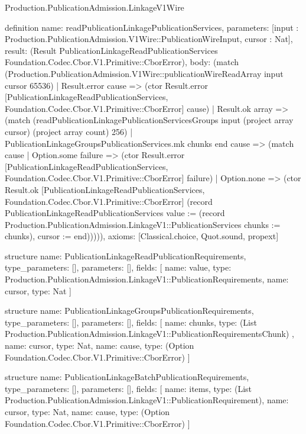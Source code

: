\begin{lexlean}{Production.PublicationAdmission.LinkageV1Wire}
\begin{semanticmodule}
definition{
  name: readPublicationLinkagePublicationServices,
  parameters: [input : Production.PublicationAdmission.V1Wire::PublicationWireInput, cursor : Nat],
  result: (Result PublicationLinkageReadPublicationServices Foundation.Codec.Cbor.V1.Primitive::CborError),
  body: (match (Production.PublicationAdmission.V1Wire::publicationWireReadArray input cursor 65536)
    | Result.error cause => (ctor Result.error [PublicationLinkageReadPublicationServices, Foundation.Codec.Cbor.V1.Primitive::CborError] cause)
    | Result.ok array => (match (readPublicationLinkagePublicationServicesGroups input (project array cursor) (project array count) 256)
      | PublicationLinkageGroupsPublicationServices.mk chunks end cause => (match cause
        | Option.some failure => (ctor Result.error [PublicationLinkageReadPublicationServices, Foundation.Codec.Cbor.V1.Primitive::CborError] failure)
        | Option.none => (ctor Result.ok [PublicationLinkageReadPublicationServices, Foundation.Codec.Cbor.V1.Primitive::CborError] (record PublicationLinkageReadPublicationServices {value := (record Production.PublicationAdmission.LinkageV1::PublicationServices {chunks := chunks}), cursor := end}))))),
  axioms: [Classical.choice, Quot.sound, propext]
}

structure{
  name: PublicationLinkageReadPublicationRequirements,
  type_parameters: [],
  parameters: [],
  fields: [
    {name: value, type: Production.PublicationAdmission.LinkageV1::PublicationRequirements},
    {name: cursor, type: Nat}
  ]
}

structure{
  name: PublicationLinkageGroupsPublicationRequirements,
  type_parameters: [],
  parameters: [],
  fields: [
    {
      name: chunks,
      type: (List Production.PublicationAdmission.LinkageV1::PublicationRequirementsChunk)
    },
    {name: cursor, type: Nat},
    {name: cause, type: (Option Foundation.Codec.Cbor.V1.Primitive::CborError)}
  ]
}

structure{
  name: PublicationLinkageBatchPublicationRequirements,
  type_parameters: [],
  parameters: [],
  fields: [
    {name: items, type: (List Production.PublicationAdmission.LinkageV1::PublicationRequirement)},
    {name: cursor, type: Nat},
    {name: cause, type: (Option Foundation.Codec.Cbor.V1.Primitive::CborError)}
  ]
}


\end{semanticmodule}
\end{lexlean}
